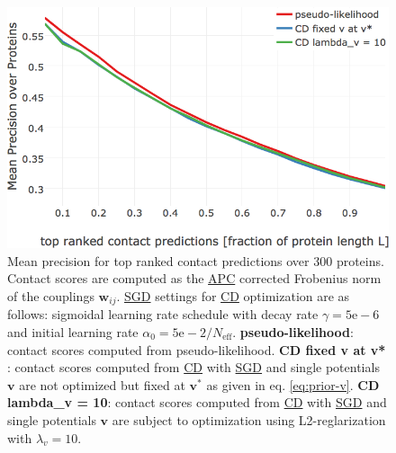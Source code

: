 \documentclass[11pt,a4paper,twoside]{book}
\newcommand{\eq}{\!=\!}
\renewcommand{\v}{\mathbf{v}}
\newcommand{\wij}{\mathbf{w}_{ij}}
\theoremstyle{definition}
\theoremstyle{definition}
\theoremstyle{remark}
\begin{document}
\begin{figure}

{\centering \includegraphics[width=0.9\linewidth]{img/full_likelihood/appendix/precision_vs_rank_fixed_v} 

}

\caption{Mean precision for top ranked
contact predictions over 300 proteins. Contact scores are computed as
the \protect\hyperlink{abbrev}{APC} corrected Frobenius norm of the
couplings \(\wij\). \protect\hyperlink{abbrev}{SGD} settings for
\protect\hyperlink{abbrev}{CD} optimization are as follows: sigmoidal
learning rate schedule with decay rate \(\gamma = \mathrm{5e-6}\) and
initial learning rate \(\alpha_0 \eq \mathrm{5e-2}/N_{\textrm{eff}}\).
\textbf{pseudo-likelihood}: contact scores computed from
pseudo-likelihood. \textbf{CD fixed v at v* }: contact scores computed
from \protect\hyperlink{abbrev}{CD} with \protect\hyperlink{abbrev}{SGD}
and single potentials \(\v\) are not optimized but fixed at \(\v^*\) as
given in eq. \eqref{eq:prior-v}. \textbf{CD lambda\_v = 10}: contact
scores computed from \protect\hyperlink{abbrev}{CD} with
\protect\hyperlink{abbrev}{SGD} and single potentials \(\v\) are subject
to optimization using L2-reglarization with \(\lambda_v \eq 10\).}\label{fig:full-likelihood-opt-fixv}
\end{figure}
\end{document}
